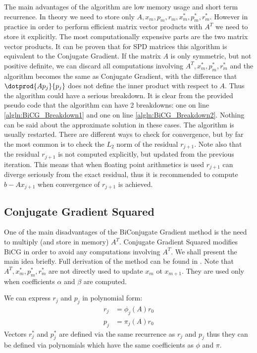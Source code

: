 The main advantages of the algorithm are low memory usage and short term recurrence. In theory we need to store only $A, x_m, p_m, r_m, x^*_m, p^*_m, r^*_m$. However in practice in order to perform efficient matrix vector products with $A^T$ we need to store it explicitly. The most computationally expensive parts are the two matrix vector products. It can be proven that for SPD matrices this algorithm is equivalent to the Conjugate Gradient. If the matrix $A$ is only symmetric, but not positive definite, we can discard all computations involving $A^T, x^*_m, p^*_m, r^*_m$ and the algorithm becomes the same as Conjugate Gradient, with the difference that $\dotprod{Ap_j}{p_j}$ does not define the inner product with respect to $A$. Thus the algorithm could have a serious breakdown. It is clear from the provided pseudo code that the algorithm can have 2 breakdowns: one on line \cref{algln:BiCG_Breakdown1} and one on line \cref{algln:BiCG_Breakdown2}. Nothing can be said about the approximate solution in these cases. The algorithm is usually restarted. There are different ways to check for convergence, but by far the most common is to check the $L_2$ norm of the residual $r_{j+1}$. Note also that the residual $r_{j+1}$ is not computed explicitly, but updated from the previous iteration. This means that when floating point arithmetics is used $r_{j+1}$ can diverge seriously from the exact residual, thus it is recommended to compute $b - Ax_{j+1}$ when convergence of $r_{j+1}$ is achieved.

\subsection{Conjugate Gradient Squared}\label{sec:CGS}
One of the main disadvantages of the BiConjugate Gradient method is the need to multiply (and store in memory) $A^T$. Conjugate Gradient Squared modifies BiCG in order to avoid any computations involving $A^T$. We shall present the main idea briefly. Full derivation of the method can be found in \cite{saad-sparse}. Note that $A^T, x^*_m, p^*_m, r^*_m$ are not directly used to update $x_m$ ot $x_{m+1}$. They are used only when coefficients $\alpha$ and $\beta$ are computed.

We can express $r_j$ and $p_j$ in polynomial form:
\begin{align}
	r_j &= \phi_j(A)r_0 \\
	p_j &= \pi_j(A)r_0
\end{align}
Vectors $r^*_j$ and $p^*_j$ are defined via the same recurrence as $r_j$ and $p_j$ thus they can be defined via polynomials which have the same coefficients as $\phi$ and $\pi$.

